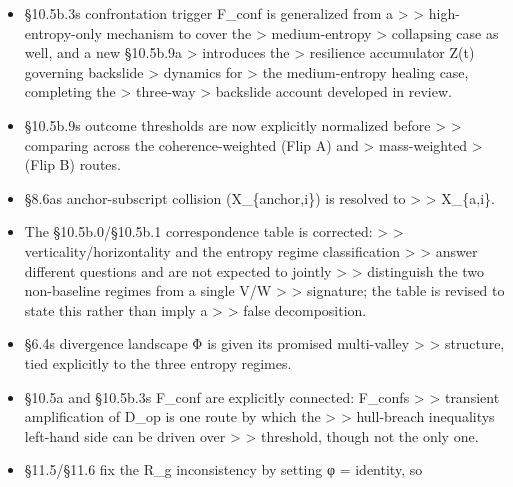 \documentclass[
]{article}
\begin{document}
\begin{itemize}
  \textgreater{} \textgreater{} Condition A\textquotesingle s outcome
  via mass-weighting, contradicting \textgreater{} \textgreater{}
  §10.5b.8\textquotesingle s explicit coherence/dissipation account for
  that same \textgreater{} \textgreater{} regime. It now uses the
  coherence account consistently.
\item
  §10.5b.3\textquotesingle s confrontation trigger F\_conf is
  generalized from a \textgreater{} \textgreater{} high-entropy-only
  mechanism to cover the \textgreater{} medium-entropy \textgreater{}
  collapsing case as well, and a new §10.5b.9a \textgreater{} introduces
  the \textgreater{} resilience accumulator Z(t) governing backslide
  \textgreater{} dynamics for \textgreater{} the medium-entropy healing
  case, completing the \textgreater{} three-way \textgreater{} backslide
  account developed in review.
\item
  §10.5b.9\textquotesingle s outcome thresholds are now explicitly
  normalized before \textgreater{} \textgreater{} comparing across the
  coherence-weighted (Flip A) and \textgreater{} mass-weighted
  \textgreater{} (Flip B) routes.
\item
  §8.6a\textquotesingle s anchor-subscript collision (X\_\{anchor,i\})
  is resolved to \textgreater{} \textgreater{} X\_\{a,i\}.
\item
  The §10.5b.0/§10.5b.1 correspondence table is corrected:
  \textgreater{} \textgreater{} verticality/horizontality and the
  entropy regime classification \textgreater{} \textgreater{} answer
  different questions and are not expected to jointly \textgreater{}
  \textgreater{} distinguish the two non-baseline regimes from a single
  V/W \textgreater{} \textgreater{} signature; the table is revised to
  state this rather than imply a \textgreater{} \textgreater{} false
  decomposition.
\item
  §6.4\textquotesingle s divergence landscape Φ is given its promised
  multi-valley \textgreater{} \textgreater{} structure, tied explicitly
  to the three entropy regimes.
\item
  §10.5a and §10.5b.3\textquotesingle s F\_conf are explicitly
  connected: F\_conf\textquotesingle s \textgreater{} \textgreater{}
  transient amplification of D\_op is one route by which the
  \textgreater{} \textgreater{} hull-breach inequality\textquotesingle s
  left-hand side can be driven over \textgreater{} \textgreater{}
  threshold, though not the only one.
\item
  §11.5/§11.6 fix the R\_g inconsistency by setting φ = identity, so

\end{itemize}
\end{document}
